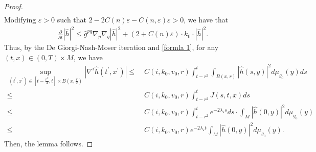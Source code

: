 \documentclass[12pt]{amsart}
\begin{document}
\begin{proof}
\begin{equation}
\begin{split}
    \end{split}
\end{equation}
Modifying $\varepsilon > 0$ such that $2 - 2C(n) \varepsilon - C(n, \varepsilon)\varepsilon > 0$, we have that 
\begin{align}
    \frac{\partial}{\partial t} |\hat{h}|^2 \leq \hat{g}^{pq} \nabla_p \nabla_q |\hat{h}|^2 + (2 + C(n)\varepsilon)\cdot k_0 \cdot |\hat{h}|^2.
\end{align}
Thus, by the De Giorgi-Nash-Moser iteration and \eqref{formla 1}, for any $(t, x)\in (0, T) \times M$, we have
\begin{equation}\label{De Giorgi-Nash-Moser iteration}
    \begin{split}
        \sup_{(t^{\prime}, x^{\prime})\in[t - \frac{r^2}{4}, t]\times B(x, \frac{r}{2})}|\nabla^{i}\hat{h}(t^{\prime}, x^{\prime})|\leq&\; C(i, k_0, v_0, r)\int_{t - r^2}^{t} \int_{B(x,r)}|\hat{h}(s, y)|^2 d\mu_{g_0}(y) ds\\  
        \leq&\; C(i, k_0, v_0, r) \int_{t - r^2}^{t}J(s, t, x) ds\\
        \leq&\; C(i, k_0, v_0, r)\int_{t - r^2}^{t} e^{-2\lambda_{\varepsilon} s}ds\cdot \int_{M}|\hat{h}(0, y)|^2d\mu_{g_0}(y)\\
        \leq&\; C(i, k_0, v_0, r)e^{-2\lambda_{\varepsilon} t}\int_{M} |\hat{h}(0, y)|^2 d\mu_{g_0}(y).
    \end{split}
\end{equation}
Then, the lemma follows. 
\end{proof}
\end{document}
